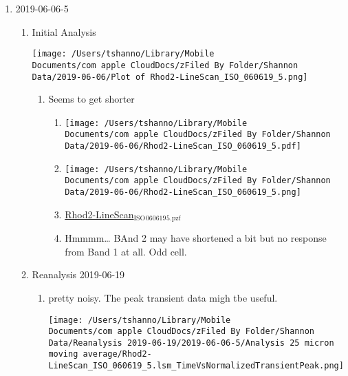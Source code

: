 \documentclass[11pt]{article}
\begin{document}
\begin{enumerate}
\begin{enumerate}
\item 2019-06-06-5
\label{sec:org95c323d}
\begin{enumerate}
\item Initial Analysis
\label{sec:org879650d}
\begin{center}
\texttt{[image: /Users/tshanno/Library/Mobile Documents/com~apple~CloudDocs/zFiled By Folder/Shannon Data/2019-06-06/Plot of Rhod2-LineScan\_ISO\_060619\_5.png]}
\end{center}
\begin{enumerate}
\item Seems to get shorter
\label{sec:org8819ca7}
\begin{enumerate}
\item \begin{center}
\texttt{[image: /Users/tshanno/Library/Mobile Documents/com~apple~CloudDocs/zFiled By Folder/Shannon Data/2019-06-06/Rhod2-LineScan\_ISO\_060619\_5.pdf]}
\end{center}
\label{sec:org044c0e6}
\item \begin{center}
\texttt{[image: /Users/tshanno/Library/Mobile Documents/com~apple~CloudDocs/zFiled By Folder/Shannon Data/2019-06-06/Rhod2-LineScan\_ISO\_060619\_5.png]}
\end{center}
\label{sec:org563cbf3}
\item \href{file:///Users/tshanno/Library/Mobile Documents/com\~apple\~CloudDocs/zFiled By Folder/Shannon Data/2019-06-06/Rhod2-LineScan\_ISO\_060619\_5.pzf}{Rhod2-LineScan\(_{\text{ISO}}\)\(_{\text{060619}}\)\(_{\text{5.pzf}}\)}
\label{sec:orga1e3188}
\item Hmmmm\ldots{}  BAnd 2 may have shortened a bit but no response from Band 1 at all.  Odd cell.
\label{sec:orge2079f0}
\end{enumerate}
\end{enumerate}
\item Reanalysis 2019-06-19
\label{sec:org892f602}
\begin{enumerate}
\item pretty noisy.  The peak transient data migh tbe useful.
\label{sec:orgf5c2d19}
\begin{center}
\texttt{[image: /Users/tshanno/Library/Mobile Documents/com~apple~CloudDocs/zFiled By Folder/Shannon Data/Reanalysis 2019-06-19/2019-06-06-5/Analysis 25 micron moving average/Rhod2-LineScan\_ISO\_060619\_5.lsm\_TimeVsNormalizedTransientPeak.png]}
\end{center}

\end{enumerate}
\end{enumerate}
\end{enumerate}
\end{enumerate}
\end{document}
